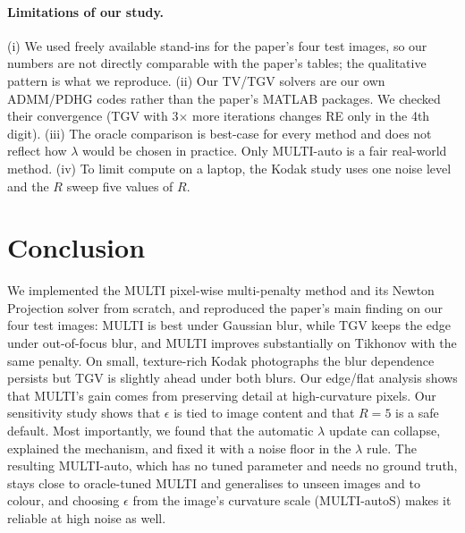 \paragraph{Limitations of our study.}
(i) We used freely available stand-ins for the paper's four test images, so our
numbers are not directly comparable with the paper's tables; the qualitative
pattern is what we reproduce.
(ii) Our TV/TGV solvers are our own ADMM/PDHG codes rather than the paper's MATLAB packages.
We checked their convergence (TGV with 3$\times$ more iterations changes RE only in the 4th digit).
(iii) The oracle comparison is best-case for every method and does not reflect how
$\lambda$ would be chosen in practice. Only MULTI-auto is a fair real-world method.
(iv) To limit compute on a laptop, the Kodak study uses one noise level and
the $R$ sweep five values of $R$.

\section{Conclusion}
\label{sec:conclusion}
We implemented the MULTI pixel-wise multi-penalty method and its Newton Projection
solver from scratch, and reproduced the paper's main finding on our four test images: MULTI is
best under Gaussian blur, while TGV keeps the edge under out-of-focus blur, and MULTI
improves substantially on Tikhonov with the same penalty. On small, texture-rich Kodak
photographs the blur dependence persists but TGV is slightly ahead under both blurs. Our edge/flat analysis shows
that MULTI's gain comes from preserving detail at high-curvature pixels. Our
sensitivity study shows that $\epsilon$ is tied to image content and that $R=5$ is a
safe default. Most importantly, we found that the automatic $\lambda$ update can
collapse, explained the mechanism, and fixed it with a noise floor in the $\lambda$ rule.
The resulting MULTI-auto, which has no tuned parameter and needs no ground truth,
stays close to oracle-tuned MULTI and generalises to unseen images and to colour, and
choosing $\epsilon$ from the image's curvature scale (MULTI-autoS) makes it reliable at
high noise as well.
